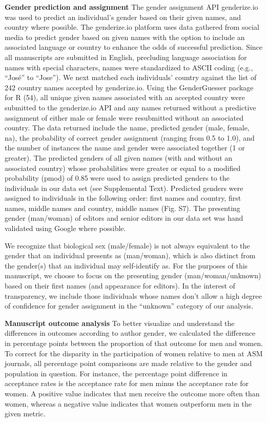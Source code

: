 \documentclass[11pt,]{article}
\begin{document}
\textbf{Gender prediction and assignment} The gender assignment API
genderize.io was used to predict an individual's gender based on their
given names, and country where possible. The genderize.io platform uses
data gathered from social media to predict gender based on given names
with the option to include an associated language or country to enhance
the odds of successful prediction. Since all manuscripts are submitted
in English, precluding language association for names with special
characters, names were standardized to ASCII coding (e.g., ``José'' to
``Jose''). We next matched each individuals' country against the list of
242 country names accepted by genderize.io. Using the GenderGuesser
package for R (54), all unique given names associated with an accepted
country were submitted to the genderize.io API and any names returned
without a predictive assignment of either male or female were
resubmitted without an associated country. The data returned include the
name, predicted gender (male, female, na), the probability of correct
gender assignment (ranging from 0.5 to 1.0), and the number of instances
the name and gender were associated together (1 or greater). The
predicted genders of all given names (with and without an associated
country) whose probabilities were greater or equal to a modified
probability (pmod) of 0.85 were used to assign predicted genders to the
individuals in our data set (see Supplemental Text). Predicted genders
were assigned to individuals in the following order: first names and
country, first names, middle names and country, middle names (Fig. S7).
The presenting gender (man/woman) of editors and senior editors in our
data set was hand validated using Google where possible.

We recognize that biological sex (male/female) is not always equivalent
to the gender that an individual presents as (man/woman), which is also
distinct from the gender(s) that an individual may self-identify as. For
the purposes of this manuscript, we choose to focus on the presenting
gender (man/woman/unknown) based on their first names (and appearance
for editors). In the interest of transparency, we include those
individuals whose names don't allow a high degree of confidence for
gender assignment in the ``unknown'' category of our analysis.

\textbf{Manuscript outcome analysis} To better visualize and understand
the differences in outcomes according to author gender, we calculated
the difference in percentage points between the proportion of that
outcome for men and women. To correct for the disparity in the
participation of women relative to men at ASM journals, all percentage
point comparisons are made relative to the gender and population in
question. For instance, the percentage point difference in acceptance
rates is the acceptance rate for men minus the acceptance rate for
women. A positive value indicates that men receive the outcome more
often than women, whereas a negative value indicates that women
outperform men in the given metric.
\end{document}
